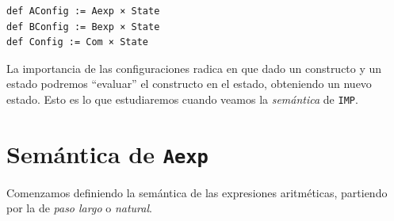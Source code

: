 \documentclass[../main.tex]{subfiles}
\begin{document}
\begin{verbatim}
def AConfig := Aexp × State
def BConfig := Bexp × State
def Config := Com × State
\end{verbatim}

La importancia de las configuraciones radica en que dado un constructo y un estado
podremos \enquote{evaluar} el constructo en el estado, obteniendo un nuevo estado.
Esto es lo que estudiaremos cuando veamos la \emph{semántica} de \texttt{IMP}.

\section{Semántica de \texttt{Aexp}}

Comenzamos definiendo la semántica de las expresiones aritméticas, partiendo por
la de \emph{paso largo} o \emph{natural}.
\end{document}
